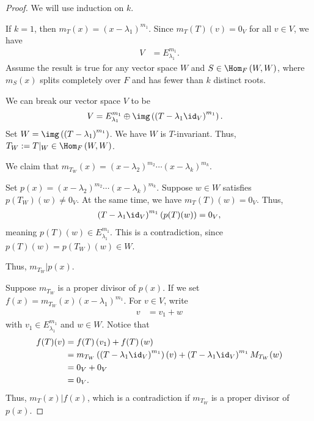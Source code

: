 \documentclass[10pt]{mypackage}
\begin{document}
\begin{proof}
  We will use induction on $k$.\newline

  If $k = 1$, then $m_T(x) = \left(x-\lambda_1\right)^{m_1}$. Since $m_{T}\left(T\right)\left(v\right) = 0_V$ for all $v\in V$, we have
  \begin{align*}
    V &= E_{\lambda_1}^{m_1}.
  \end{align*}
  Assume the result is true for any vector space $W$ and $S\in \Hom_{F}\left(W,W\right)$, where $m_S(x)$ splits completely over $F$ and has fewer than $k$ distinct roots.\newline

  We can break our vector space $V$ to be
  \begin{align*}
    V &= E_{\lambda_1}^{m_1}\oplus \img\left(\left(T-\lambda_1\id_{V}\right)^{m_1}\right).
  \end{align*}
  Set $W = \img\left(\left(T-\lambda_1\right)^{m_1}\right)$. We have $W$ is $T$-invariant. Thus, $T_W := T\vert_{W}\in \Hom_{F}\left(W,W\right)$.\newline

  We claim that $m_{T_W}(x) = \left(x-\lambda_2\right)^{m_2}\cdots \left(x-\lambda_k\right)^{m_k}$.\newline

  Set $p(x) = \left(x-\lambda_2\right)^{m_2}\cdots \left(x-\lambda_k\right)^{m_k}$. Suppose $w\in W$ satisfies $p\left(T_W\right)\left(w\right) \neq 0_V$. At the same time, we have $m_{T}(T)(w) = 0_V$. Thus,
  \begin{align*}
    \left(T-\lambda_1\id_V\right)^{m_1}\left(p(T)(w)\right) = 0_V,
  \end{align*}
  meaning $p(T)(w) \in E_{\lambda_1}^{m_1}$. This is a contradiction, since $p(T)(w) = p\left(T_W\right)(w)\in W$.\newline

  Thus, $m_{T_W}|p(x)$.\newline

  Suppose $m_{T_W}$ is a proper divisor of $p(x)$. If we set $f(x) = m_{T_W}(x)\left(x-\lambda_1\right)^{m_1}$. For $v\in V$, write
  \begin{align*}
    v &= v_1 + w
  \end{align*}
  with $v_1\in E_{\lambda_1}^{m_1}$ and $w\in W$. Notice that
  \begin{align*}
    f(T)(v) &= f(T)\left(v_1\right) + f(T)\left(w\right)\\
            &= m_{T_W}\left(\left(T-\lambda_1\id_V\right)^{m_1}\right)(v) + \left(T-\lambda_1\id_V\right)^{m_1}M_{T_W}(w)\\
            &= 0_V + 0_V\\
            &= 0_V.
  \end{align*}
  Thus, $m_{T}(x)|f(x)$, which is a contradiction if $m_{T_W}$ is a proper divisor of $p(x)$.\newline


\end{proof}
\end{document}
